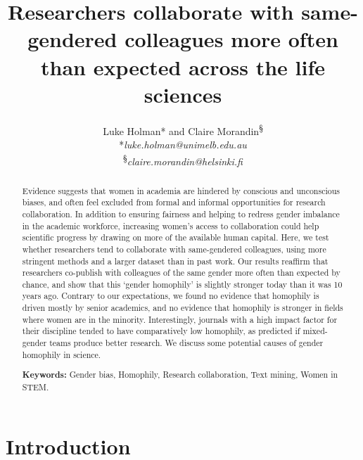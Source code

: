 \documentclass[12pt,]{article}
\title{Researchers collaborate with same-gendered colleagues more often than
expected across the life sciences}
\author{Luke Holman* and Claire Morandin\textsuperscript{§} \\ *\textit{luke.holman@unimelb.edu.au} \\ \textsuperscript{§}\textit{claire.morandin@helsinki.fi} \vspace{5mm}}
\date{}
\begin{document}
\maketitle
\begin{abstract}
Evidence suggests that women in academia are hindered by conscious and
unconscious biases, and often feel excluded from formal and informal
opportunities for research collaboration. In addition to ensuring
fairness and helping to redress gender imbalance in the academic
workforce, increasing women's access to collaboration could help
scientific progress by drawing on more of the available human capital.
Here, we test whether researchers tend to collaborate with same-gendered
colleagues, using more stringent methods and a larger dataset than in
past work. Our results reaffirm that researchers co-publish with
colleagues of the same gender more often than expected by chance, and
show that this `gender homophily' is slightly stronger today than it was
10 years ago. Contrary to our expectations, we found no evidence that
homophily is driven mostly by senior academics, and no evidence that
homophily is stronger in fields where women are in the minority.
Interestingly, journals with a high impact factor for their discipline
tended to have comparatively low homophily, as predicted if mixed-gender
teams produce better research. We discuss some potential causes of
gender homophily in science. \vspace{5mm}
\par\noindent \textbf{Keywords:} Gender bias, Homophily, Research
collaboration, Text mining, Women in STEM.
\end{abstract}

\maketitle

\maketitle{}

\newpage

\section{Introduction}\label{introduction}
\end{document}
